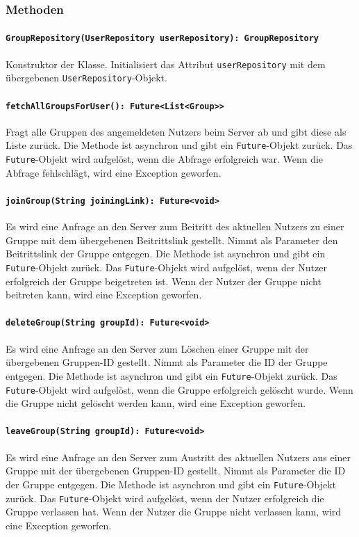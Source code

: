 \documentclass[parskip=full]{scrartcl}
\begin{document}
\subsubsection*{Methoden}
\paragraph{\texttt{GroupRepository(UserRepository userRepository): GroupRepository}}
Konstruktor der Klasse. Initialisiert das Attribut \texttt{userRepository} mit dem übergebenen \texttt{UserRepository}-Objekt.
\paragraph{\texttt{fetchAllGroupsForUser(): Future<List<Group>>}}
Fragt alle Gruppen des angemeldeten Nutzers beim Server ab und gibt diese als Liste zurück. Die Methode ist asynchron und gibt ein \texttt{Future}-Objekt zurück. Das \texttt{Future}-Objekt wird aufgelöst, wenn die Abfrage erfolgreich war. Wenn die Abfrage fehlschlägt, wird eine Exception geworfen.
\paragraph{\texttt{joinGroup(String joiningLink): Future<void>}}
Es wird eine Anfrage an den Server zum Beitritt des aktuellen Nutzers zu einer Gruppe mit dem übergebenen Beitrittslink gestellt. Nimmt als Parameter den Beitrittslink der Gruppe entgegen. Die Methode ist asynchron und gibt ein \texttt{Future}-Objekt zurück. Das \texttt{Future}-Objekt wird aufgelöst, wenn der Nutzer erfolgreich der Gruppe beigetreten ist. Wenn der Nutzer der Gruppe nicht beitreten kann, wird eine Exception geworfen.
\paragraph{\texttt{deleteGroup(String groupId): Future<void>}}
Es wird eine Anfrage an den Server zum Löschen einer Gruppe mit der übergebenen Gruppen-ID gestellt. Nimmt als Parameter die ID der Gruppe entgegen. Die Methode ist asynchron und gibt ein \texttt{Future}-Objekt zurück. Das \texttt{Future}-Objekt wird aufgelöst, wenn die Gruppe erfolgreich gelöscht wurde. Wenn die Gruppe nicht gelöscht werden kann, wird eine Exception geworfen.
\paragraph{\texttt{leaveGroup(String groupId): Future<void>}}
Es wird eine Anfrage an den Server zum Austritt des aktuellen Nutzers aus einer Gruppe mit der übergebenen Gruppen-ID gestellt. Nimmt als Parameter die ID der Gruppe entgegen. Die Methode ist asynchron und gibt ein \texttt{Future}-Objekt zurück. Das \texttt{Future}-Objekt wird aufgelöst, wenn der Nutzer erfolgreich die Gruppe verlassen hat. Wenn der Nutzer die Gruppe nicht verlassen kann, wird eine Exception geworfen.
\end{document}
